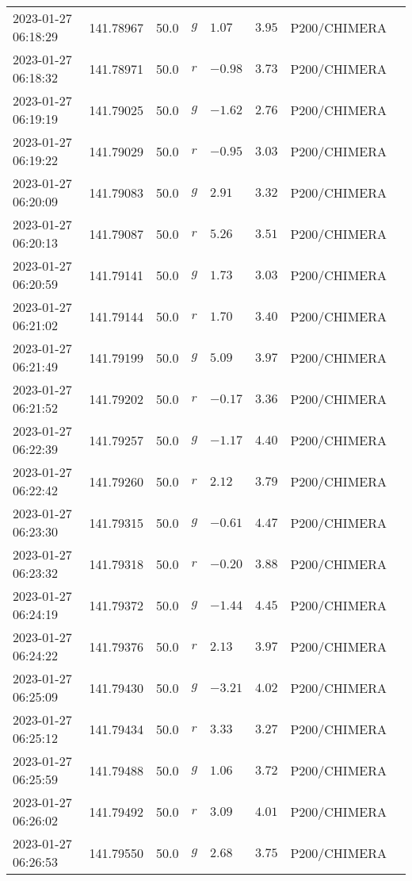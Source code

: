 \documentclass{nature_plusfigure}
\begin{document}
\begin{supplement}
\begin{center}
\begin{longtable}{llllllll}
2023-01-27 06:18:29 & 141.78967 & 50.0 & $g$ & $1.07$ & $3.95$ & P200/CHIMERA &  \\ 
2023-01-27 06:18:32 & 141.78971 & 50.0 & $r$ & $-0.98$ & $3.73$ & P200/CHIMERA &  \\ 
2023-01-27 06:19:19 & 141.79025 & 50.0 & $g$ & $-1.62$ & $2.76$ & P200/CHIMERA &  \\ 
2023-01-27 06:19:22 & 141.79029 & 50.0 & $r$ & $-0.95$ & $3.03$ & P200/CHIMERA &  \\ 
2023-01-27 06:20:09 & 141.79083 & 50.0 & $g$ & $2.91$ & $3.32$ & P200/CHIMERA &  \\ 
2023-01-27 06:20:13 & 141.79087 & 50.0 & $r$ & $5.26$ & $3.51$ & P200/CHIMERA &  \\ 
2023-01-27 06:20:59 & 141.79141 & 50.0 & $g$ & $1.73$ & $3.03$ & P200/CHIMERA &  \\ 
2023-01-27 06:21:02 & 141.79144 & 50.0 & $r$ & $1.70$ & $3.40$ & P200/CHIMERA &  \\ 
2023-01-27 06:21:49 & 141.79199 & 50.0 & $g$ & $5.09$ & $3.97$ & P200/CHIMERA &  \\ 
2023-01-27 06:21:52 & 141.79202 & 50.0 & $r$ & $-0.17$ & $3.36$ & P200/CHIMERA &  \\ 
2023-01-27 06:22:39 & 141.79257 & 50.0 & $g$ & $-1.17$ & $4.40$ & P200/CHIMERA &  \\ 
2023-01-27 06:22:42 & 141.79260 & 50.0 & $r$ & $2.12$ & $3.79$ & P200/CHIMERA &  \\ 
2023-01-27 06:23:30 & 141.79315 & 50.0 & $g$ & $-0.61$ & $4.47$ & P200/CHIMERA &  \\ 
2023-01-27 06:23:32 & 141.79318 & 50.0 & $r$ & $-0.20$ & $3.88$ & P200/CHIMERA &  \\ 
2023-01-27 06:24:19 & 141.79372 & 50.0 & $g$ & $-1.44$ & $4.45$ & P200/CHIMERA &  \\ 
2023-01-27 06:24:22 & 141.79376 & 50.0 & $r$ & $2.13$ & $3.97$ & P200/CHIMERA &  \\ 
2023-01-27 06:25:09 & 141.79430 & 50.0 & $g$ & $-3.21$ & $4.02$ & P200/CHIMERA &  \\ 
2023-01-27 06:25:12 & 141.79434 & 50.0 & $r$ & $3.33$ & $3.27$ & P200/CHIMERA &  \\ 
2023-01-27 06:25:59 & 141.79488 & 50.0 & $g$ & $1.06$ & $3.72$ & P200/CHIMERA &  \\ 
2023-01-27 06:26:02 & 141.79492 & 50.0 & $r$ & $3.09$ & $4.01$ & P200/CHIMERA &  \\ 
2023-01-27 06:26:53 & 141.79550 & 50.0 & $g$ & $2.68$ & $3.75$ & P200/CHIMERA &  \\ 

\end{longtable}
\end{center}
\end{supplement}
\end{document}
